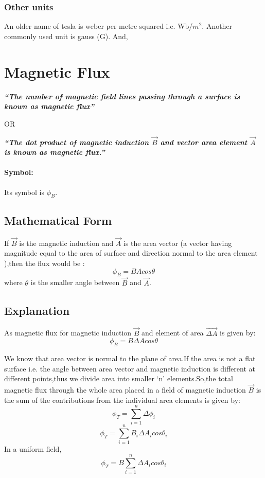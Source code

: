 \subsubsection{Other units}
An older name of tesla is weber per metre squared i.e. Wb/$m^{2}$. Another commonly used unit is gauss (G).
And,


\section{Magnetic Flux}
\textit{\textbf{“The number of magnetic field lines passing through a surface is known as magnetic flux”}}
\begin{center}
    OR
\end{center}
\textit{\textbf{“The dot product of magnetic induction $\vec{B}$ and vector area element $\vec{A}$ is known as magnetic flux.”}}
\paragraph{Symbol:}
Its symbol is $\phi_{B}$.

\subsection{Mathematical Form}
If $\vec{B}$ is the magnetic induction and $\vec{A}$ is the area vector (a vector having magnitude equal to the area of surface and direction normal to the area element ),then the flux would be :
\begin{equation}
  \phi_{B} = BA cos\theta \nonumber
\end{equation}
where $\theta$ is the smaller angle between $\vec{B}$ and $\vec{A}$.

\subsection{Explanation}
As magnetic flux for magnetic induction $\vec{B}$ and element of area $\vec{\Delta A}$ is given by:
\begin{equation}
  \phi_{B} = B\Delta A cos\theta \nonumber
\end{equation}

We know that area vector is normal to the plane of area.If the area is not a flat surface i.e. the angle between area vector and magnetic induction is different at different points,thus we divide area into smaller ‘n’ elements.So,the total magnetic flux through the whole area placed in a field of magnetic induction $\vec{B}$ is the sum of the contributions from the individual area elements is given by:
\begin{equation}
 \phi_{T} =  \sum_{i=1}^{n} \Delta \phi_{i} \nonumber
\end{equation}
\begin{equation}
\phi_{T} =  \sum_{i=1}^{n} B_{i}\Delta A_{i}cos\theta_{i} \nonumber
\end{equation}
In a uniform field,
\begin{equation}
\phi_{T} = B \sum_{i=1}^{n} \Delta A_{i}cos\theta_{i} \nonumber  
\end{equation}

